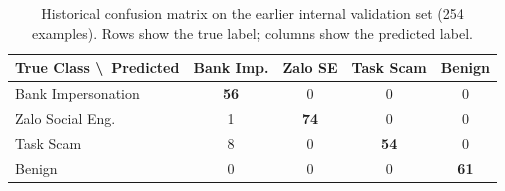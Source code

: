 \begin{table}[H]
\centering
\setlength{\tabcolsep}{10pt}
\renewcommand{\arraystretch}{1.3}
\begin{tabular}{lcccc}
\toprule
\textbf{True Class \textbackslash\ Predicted} & \textbf{Bank Imp.} & \textbf{Zalo SE} & \textbf{Task Scam} & \textbf{Benign} \\
\midrule
Bank Impersonation   & \cellcolor{CVBLUE!15}\textbf{56} &  0 &  0 &  0 \\
Zalo Social Eng.     &  1 & \cellcolor{CVBLUE!15}\textbf{74} &  0 &  0 \\
Task Scam            &  8 &  0 & \cellcolor{CVBLUE!15}\textbf{54} &  0 \\
Benign               &  0 &  0 &  0 & \cellcolor{CVBLUE!15}\textbf{61} \\
\bottomrule
\end{tabular}
\caption{Historical confusion matrix on the earlier internal validation set (254 examples). Rows show the true label; columns show the predicted label.}
\label{tab:confusion-matrix}
\end{table}
